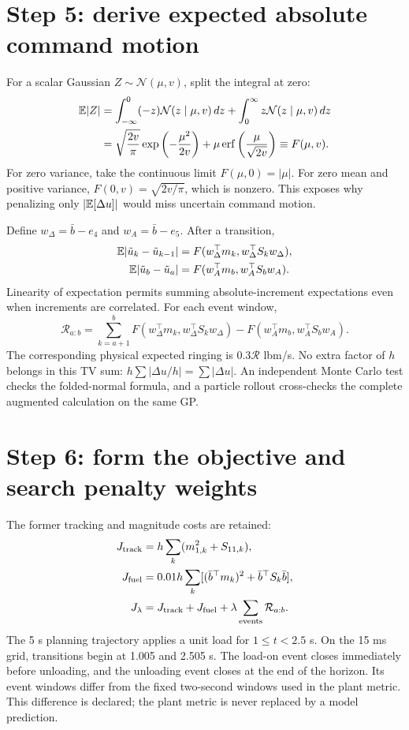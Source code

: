 \section{Step 5: derive expected absolute command motion}
For a scalar Gaussian $Z\sim\mathcal N(\mu,v)$, split the integral at zero:
\begin{align}
\mathbb{E}|Z|&=\int_{-\infty}^0(-z)\mathcal N(z\mid\mu,v)\,dz+
\int_0^\infty z\mathcal N(z\mid\mu,v)\,dz\\
&=\sqrt{\frac{2v}{\pi}}\exp\left(-\frac{\mu^2}{2v}\right)+
\mu\operatorname{erf}\left(\frac{\mu}{\sqrt{2v}}\right)
\equiv F(\mu,v).
\end{align}
For zero variance, take the continuous limit $F(\mu,0)=|\mu|$. For zero mean and positive variance, $F(0,v)=\sqrt{2v/\pi}$, which is nonzero. This exposes why penalizing only $|\mathbb{E}[\Delta u]|$ would miss uncertain command motion.

Define $w_\Delta=\bar b-e_4$ and $w_A=\bar b-e_5$. After a transition,
\begin{align}
\mathbb{E}|\tilde u_k-\tilde u_{k-1}|&=F(w_\Delta^\top m_k,w_\Delta^\top S_kw_\Delta),\\
\mathbb{E}|\tilde u_b-\tilde u_a|&=F(w_A^\top m_b,w_A^\top S_bw_A).
\end{align}
Linearity of expectation permits summing absolute-increment expectations even when increments are correlated. For each event window,
\begin{equation}
\mathcal R_{a:b}=\sum_{k=a+1}^{b}F(w_\Delta^\top m_k,w_\Delta^\top S_kw_\Delta)
-F(w_A^\top m_b,w_A^\top S_bw_A).
\end{equation}
The corresponding physical expected ringing is $0.3\mathcal R$ lbm/s. No extra factor of $h$ belongs in this TV sum: $h\sum |\Delta u/h|=\sum|\Delta u|$. An independent Monte Carlo test checks the folded-normal formula, and a particle rollout cross-checks the complete augmented calculation on the same GP.

\section{Step 6: form the objective and search penalty weights}
The former tracking and magnitude costs are retained:
\begin{align}
J_{\rm track}&=h\sum_k(m_{1,k}^2+S_{11,k}),\\
J_{\rm fuel}&=0.01h\sum_k[(\bar b^\top m_k)^2+\bar b^\top S_k\bar b],\\
J_\lambda&=J_{\rm track}+J_{\rm fuel}+\lambda\sum_{\rm events}\mathcal R_{a:b}.
\end{align}
The 5 s planning trajectory applies a unit load for $1\le t<2.5$ s. On the 15 ms grid, transitions begin at 1.005 and 2.505 s. The load-on event closes immediately before unloading, and the unloading event closes at the end of the horizon. Its event windows differ from the fixed two-second windows used in the plant metric. This difference is declared; the plant metric is never replaced by a model prediction.

